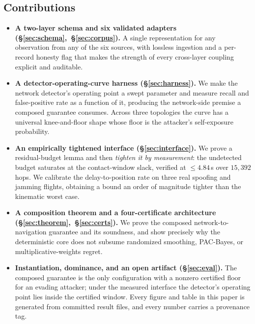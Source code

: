 \subsection*{Contributions}
\begin{itemize}
\item \textbf{A two-layer schema and six validated adapters
(\S\ref{sec:schema},~\S\ref{sec:corpus}).} A single representation for any
observation from any of the six sources, with lossless ingestion and a
per-record honesty flag that makes the strength of every cross-layer coupling
explicit and auditable.

\item \textbf{A detector-operating-curve harness (\S\ref{sec:harness}).} We make
the network detector's operating point a swept parameter and measure recall and
false-positive rate as a function of it, producing the network-side premise a
composed guarantee consumes. Across three topologies the curve has a universal
knee-and-floor shape whose floor is the attacker's self-exposure probability.

\item \textbf{An empirically tightened interface (\S\ref{sec:interface}).} We
prove a residual-budget lemma and then \emph{tighten it by measurement}: the
undetected budget saturates at the contact-window slack, verified at
$\le 4.84$\,s over $15{,}392$ hops. We calibrate the delay-to-position rate on
three real spoofing and jamming flights, obtaining a bound an order of magnitude
tighter than the kinematic worst case.

\item \textbf{A composition theorem and a four-certificate architecture
(\S\ref{sec:theorem},~\S\ref{sec:certs}).} We prove the composed
network-to-navigation guarantee and its soundness, and show precisely why the
deterministic core does not subsume randomized smoothing, PAC-Bayes, or
multiplicative-weights regret.

\item \textbf{Instantiation, dominance, and an open artifact
(\S\ref{sec:eval}).} The composed guarantee is the only configuration with a
nonzero certified floor for an evading attacker; under the measured interface
the detector's operating point lies inside the certified window. Every figure
and table in this paper is generated from committed result files, and every
number carries a provenance tag.
\end{itemize}

